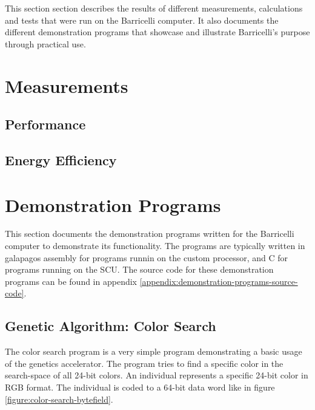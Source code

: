 This section section describes the results of different measurements, calculations and tests that were run on the Barricelli computer.
It also documents the different demonstration programs that showcase and illustrate Barricelli's purpose through practical use.

\section{Measurements}

\subsection{Performance}





\subsection{Energy Efficiency}


\section{Demonstration Programs}

This section documents the demonstration programs written for the Barricelli computer to demonstrate its functionality.
The programs are typically written in \gls{galapagos} assembly for programs runnin on the custom processor, and C for programs running on the \Gls{SCU}.
The source code for these demonstration programs can be found in appendix \vref{appendix:demonstration-programs-source-code}.

\subsection{Genetic Algorithm: Color Search}

The color search program is a very simple program demonstrating a basic usage of the genetics accelerator.
The program tries to find a specific color in the search-space of all 24-bit colors.
An individual represents a specific 24-bit color in RGB format.
The individual is coded to a 64-bit data word like in figure \vref{figure:color-search-bytefield}.

